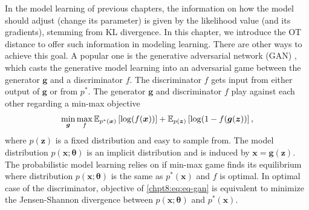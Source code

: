 \begin{remark}
  In the model learning of previous chapters, the information on how the model should adjust (change its parameter) is given by the likelihood value (and its gradients), stemming from KL divergence. In this chapter, we introduce the OT distance to offer such information in modeling learning. There are other ways to achieve this goal. A popular one is the generative adversarial network (GAN) \cite{goodfellow2014gan, 2017arXiv170100160G}, which casts the generative model learning into an adversarial game between the generator $\bm{g}$ and a discriminator $f$.
The {discriminator} $f$ gets input from either output of $\bm{g}$ or from
$p^{\ast}$. The generator $\bm{g}$ and discriminator ${f}$ play against each other
regarding a min-max objective
\begin{equation}\label{chpt8:eq:eq-gan}
  \min_{\bm{g}} \max_f \mathbb{E}_{p^{\ast}(\bm{x})}\left[ \log(f(\bm{x})) \right] + \mathbb{E}_{p(\bm{z})}\left[ \log(1-f(\bm{g}(\bm{z})) \right],
\end{equation}
where $p(\bm{z})$ is a fixed distribution and easy to sample from. The model distribution $p(\bm{x}; \bm{\theta})$ is an implicit distribution and is induced by $\bm{x} = \bm{g}(\bm{z})$.
The probabilistic model learning relies on if min-max game finds
its equilibrium where distribution $p(\bm{x}; \bm{\theta})$ is the same as $p^{\ast}(\bm{x})$ and
$f$ is optimal. In optimal case of the discriminator, objective of
\eqref{chpt8:eq:eq-gan} is equivalent to minimize the Jensen-Shannon divergence between $p(\bm{x}; \bm{\theta})$ and $p^{\ast}(\bm{x})$.
\end{remark}



